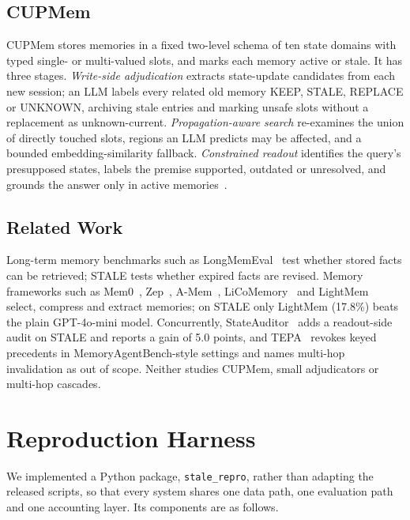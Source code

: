 \documentclass[conference]{IEEEtran}
\newcommand{\code}[1]{\texttt{\small #1}}
\begin{document}
\subsection{CUPMem}
CUPMem stores memories in a fixed two-level schema of ten state domains with typed single- or multi-valued slots, and marks each memory active or stale. It has three stages. \emph{Write-side adjudication} extracts state-update candidates from each new session; an LLM labels every related old memory KEEP, STALE, REPLACE or UNKNOWN, archiving stale entries and marking unsafe slots without a replacement as unknown-current. \emph{Propagation-aware search} re-examines the union of directly touched slots, regions an LLM predicts may be affected, and a bounded embedding-similarity fallback. \emph{Constrained readout} identifies the query's presupposed states, labels the premise supported, outdated or unresolved, and grounds the answer only in active memories~\cite{chao2026stale}.

\subsection{Related Work}
Long-term memory benchmarks such as LongMemEval~\cite{wu2025longmemeval} test whether stored facts can be retrieved; STALE tests whether expired facts are revised. Memory frameworks such as Mem0~\cite{chhikara2025mem0}, Zep~\cite{rasmussen2025zep}, A-Mem~\cite{xu2025amem}, LiCoMemory~\cite{huang2026licomemory} and LightMem~\cite{fang2026lightmem} select, compress and extract memories; on STALE only LightMem (17.8\%) beats the plain GPT-4o-mini model. Concurrently, StateAuditor~\cite{sun2026stateauditor} adds a readout-side audit on STALE and reports a gain of 5.0 points, and TEPA~\cite{zhou2026tepa} revokes keyed precedents in MemoryAgentBench-style settings and names multi-hop invalidation as out of scope. Neither studies CUPMem, small adjudicators or multi-hop cascades.

\section{Reproduction Harness}\label{sec:harness}
We implemented a Python package, \code{stale\_repro}, rather than adapting the released scripts, so that every system shares one data path, one evaluation path and one accounting layer. Its components are as follows.
\end{document}
